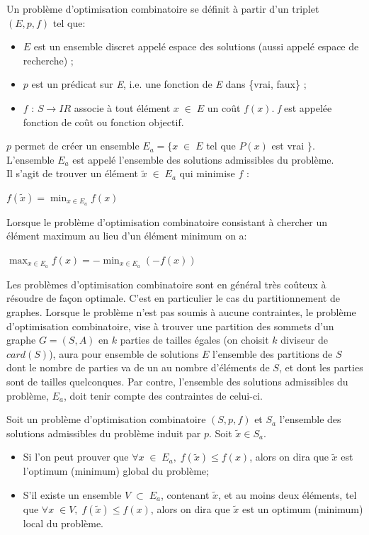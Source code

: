 \begin{definition}
	Un problème d'optimisation combinatoire se définit à partir d'un triplet $(E, p, f)$ tel que:
\begin{itemize}	
	\item $E$ est un ensemble discret appelé espace des solutions (aussi appelé espace de recherche) ;
	\item $p$ est un prédicat sur \emph{E}, i.e. une fonction de \emph{E} dans  \{vrai, faux\} ;
	\item $f$ : $S \rightarrow IR$ associe à tout élément $x \;\in\; E$ un coût $f(x)$. \emph{f} est appelée fonction  de coût ou fonction objectif.
	\end{itemize}
	$p$ permet de créer un ensemble $E_a = \{x\;\in\; E$ tel que $P(x)$ est vrai $\}$. L'ensemble $E_a$ est appelé l'ensemble des solutions admissibles du problème.\\
	Il s'agit de trouver un élément $\tilde{x} \;\in\; E_a$ qui minimise $f$ :
	\begin{center}
	$\displaystyle f(\tilde{x}) = \min_{x\in E_a}f(x)$
	\end{center}
	Lorsque le problème d'optimisation combinatoire consistant à chercher un élément maximum au
lieu d'un élément minimum on a:
\begin{center}
	$\displaystyle \max_{x\in E_a}f(x) = -\min_{x\in E_a}(-f(x))$
	\end{center}
\end{definition}
	Les problèmes d'optimisation combinatoire sont en général très coûteux à résoudre de façon optimale. C'est en particulier le cas du partitionnement de graphes.
Lorsque le problème n'est pas soumis à aucune contraintes, le problème d'optimisation combinatoire, vise à trouver une partition des sommets d'un graphe $G = (S, A)$ en $k$ parties de tailles égales (on choisit $k$ diviseur de $card(S)$), aura pour ensemble de solutions $E$ l'ensemble des partitions de $S$ dont le nombre de parties va de un au nombre d'éléments de $S$, et dont les parties sont de tailles quelconques. Par contre, l'ensemble des solutions admissibles du problème, $E_a$, doit tenir compte des contraintes de celui-ci.

\begin{definition}
	Soit un problème d'optimisation combinatoire $(S, p, f)$ et $S_a$ l'ensemble des solutions admissibles du problème induit par $p$. Soit $\tilde{x} \in S_a$.
	\begin{itemize}
	\item Si l'on peut prouver que $\forall x \;\in\; E_a,\; f(\tilde{x})\leq f(x)$, alors on dira que $\tilde{x}$ est l'optimum (minimum) global du problème;
	\item S'il existe un ensemble $V\; \subset\; E_a$, contenant $\tilde{x}$, et au moins deux éléments, tel que $\forall x\;\in V,\; f(\tilde{x}) \leq f(x)$, alors on dira que $\tilde{x}$ est un optimum (minimum) local du problème.
	\end{itemize}
\end{definition}	
	
